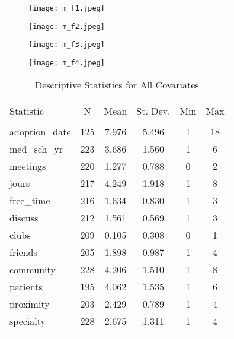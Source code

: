\documentclass[11pt]{article}
\begin{document}
\begin{figure}
\centering
\begin{minipage}{.5\textwidth}
 \centering
 \hspace*{-0.9in}
  \texttt{[image: m\_f1.jpeg]}
  \label{fig:test1}
\end{minipage}%
\begin{minipage}{.5\textwidth}
\centering
\hspace*{-0.0in}
  \texttt{[image: m\_f2.jpeg]}
  \label{fig:test2}
\end{minipage}
\begin{minipage}{.5\textwidth}
 \centering
 \hspace*{-0.9in}
  \texttt{[image: m\_f3.jpeg]}
  \label{fig:test1}
\end{minipage}%
\begin{minipage}{.5\textwidth}
\centering
\hspace*{-0.0in}
  \texttt{[image: m\_f4.jpeg]}
  \label{fig:test2}
\end{minipage}
\end{figure}

\clearpage

\begin{table}[ht] \centering 
  \caption{Descriptive Statistics for All Covariates} 
  \label{} 
\begin{tabular}{@{\extracolsep{5pt}}lccccc} 
\\[-1.8ex]\hline 
\hline \\[-1.8ex] 
Statistic & \multicolumn{1}{c}{N} & \multicolumn{1}{c}{Mean} & \multicolumn{1}{c}{St. Dev.} & \multicolumn{1}{c}{Min} & \multicolumn{1}{c}{Max} \\ 
\hline \\[-1.8ex] 
adoption\_date & 125 & 7.976 & 5.496 & 1 & 18 \\ 
med\_sch\_yr & 223 & 3.686 & 1.560 & 1 & 6 \\ 
meetings & 220 & 1.277 & 0.788 & 0 & 2 \\ 
jours & 217 & 4.249 & 1.918 & 1 & 8 \\ 
free\_time & 216 & 1.634 & 0.830 & 1 & 3 \\ 
discuss & 212 & 1.561 & 0.569 & 1 & 3 \\ 
clubs & 209 & 0.105 & 0.308 & 0 & 1 \\ 
friends & 205 & 1.898 & 0.987 & 1 & 4 \\ 
community & 228 & 4.206 & 1.510 & 1 & 8 \\ 
patients & 195 & 4.062 & 1.535 & 1 & 6 \\ 
proximity & 203 & 2.429 & 0.789 & 1 & 4 \\ 
specialty & 228 & 2.675 & 1.311 & 1 & 4 \\ 
\hline \\[-1.8ex] 
\end{tabular} 
\end{table} 
\end{document}
